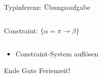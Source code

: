 \documentclass{beamer}
\begin{document}
\begin{frame}{Typinferenz: Übungsaufgabe}
\begin{columns}
\begin{column}{0.3\textwidth}
			Constraint: $\{ \alpha = \pi \to \beta \}$
		\end{column}
	\end{columns}

	\begin{itemize}
		\item Constraint-System auflösen
	\end{itemize}
\end{frame}

\begin{frame}{Ende}
	Gute Ferienzeit!
\end{frame}
\end{document}
